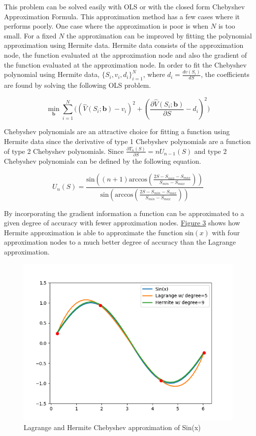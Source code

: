 \documentclass[12pt]{article}
\begin{document}
This problem can be solved easily with OLS or with the closed form Chebyshev Approximation Formula. This approximation method has a few cases where it performs poorly. One case where the approximation is poor is when $N$ is too small. For a fixed $N$ the approximation can be improved by fitting the polynomial approximation using Hermite data. Hermite data consists of the approximation node, the function evaluated at the approximation node and also the gradient of the function evaluated at the approximation node. In order to fit the Chebyshev polynomial using Hermite data, $\{S_i,v_i,d_i\}_{i=1}^N$, where $d_i=\frac{d v(S_i)}{d S}$, the coefficients are found by solving the following OLS problem.

\begin{equation*}
  \min_{\boldsymbol{b}} \sum_{i=1}^N\bigg((\hat{V}(S_i;\boldsymbol{b})-v_i)^2 + (\frac{\partial \hat{V}(S_i;\boldsymbol{b})}{\partial S} - d_i)^2 \bigg)
\end{equation*}

Chebyshev polynomials are an attractive choice for fitting a function using Hermite data since the derivative of type 1 Chebyshev polynomials are a function of type 2 Chebyshev polynomials. Since $\frac{\partial T_n(S)}{\partial S} = n U_{n-1}(S)$ and type 2 Chebyshev polynomials can be defined by the following equation.

\begin{equation*}
  U_n(S) = \frac{\text{sin}((n+1) \text{arccos}(\frac{2S-S_{min}-S_{max}}{S_{min}-S_{max}}))}{\text{sin}(\text{arccos}(\frac{2S-S_{min}-S_{max}}{S_{min}-S_{max}}))}
\end{equation*}

By incorporating the gradient information a function can be approximated to a given degree of accuracy with fewer approximation nodes. \hyperref[ref_Cheb_Sin_Func]{Figure 3} shows how Hermite approximation is able to approximate the function $\text{sin}(x)$ with four approximation nodes to a much better degree of accuracy than the Lagrange approximation.

\begin{figure}[H]
  \centering
  \label{ref_Cheb_Sin_Func}
  \includegraphics[scale=.8]{plot_Cheb_Sin_Func}
  \caption{Lagrange and Hermite Chebyshev approximation of Sin(x)}
\end{figure}
\end{document}
